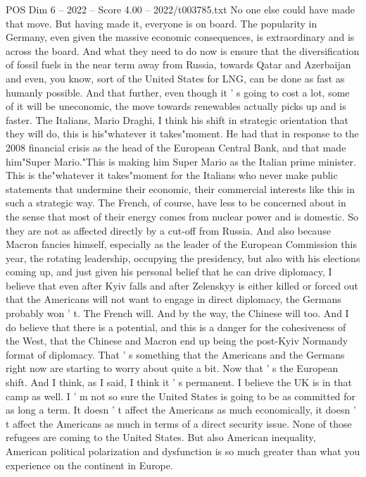 \begin{textsample}{POS Dim 6 – 2022 – Score 4.00 – 2022/t003785.txt}
No one else could have made that move.
But having made it, everyone is on board.
The popularity in Germany, even given the massive economic consequences, is extraordinary and is across the board.
And what they need to do now is ensure that the diversification of fossil fuels in the near term away from Russia, towards Qatar and Azerbaijan and even, you know, sort of the United States for LNG, can be done as fast as humanly possible.
And that further, even though it ' s going to cost a lot, some of it will be uneconomic, the move towards renewables actually picks up and is faster.
The Italians, Mario Draghi, I think his shift in strategic orientation that they will do, this is his"whatever it takes"moment.
He had that in response to the 2008 financial crisis as the head of the European Central Bank, and that made him"Super Mario."This is making him Super Mario as the Italian prime minister.
This is the"whatever it takes"moment for the Italians who never make public statements that undermine their economic, their commercial interests like this in such a strategic way.
The French, of course, have less to be concerned about in the sense that most of their energy comes from nuclear power and is domestic.
So they are not as affected directly by a cut-off from Russia.
And also because Macron fancies himself, especially as the leader of the European Commission this year, the rotating leadership, occupying the presidency, but also with his elections coming up, and just given his personal belief that he can drive diplomacy, I believe that even after Kyiv falls and after Zelenskyy is either killed or forced out that the Americans will not want to engage in direct diplomacy, the Germans probably won ' t.
The French will.
And by the way, the Chinese will too.
And I do believe that there is a potential, and this is a danger for the cohesiveness of the West, that the Chinese and Macron end up being the post-Kyiv Normandy format of diplomacy.
That ' s something that the Americans and the Germans right now are starting to worry about quite a bit.
Now that ' s the European shift.
And I think, as I said, I think it ' s permanent.
I believe the UK is in that camp as well.
I ' m not so sure the United States is going to be as committed for as long a term.
It doesn ' t affect the Americans as much economically, it doesn ' t affect the Americans as much in terms of a direct security issue.
None of those refugees are coming to the United States.
But also American inequality, American political polarization and dysfunction is so much greater than what you experience on the continent in Europe.

\end{textsample}
